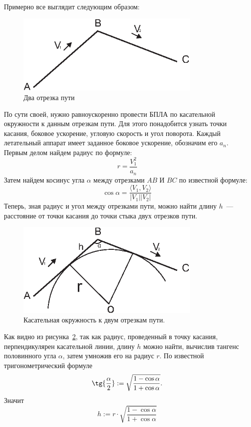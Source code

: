 \documentclass[a4paper,12pt]{article}
\begin{document}
Примерно все выглядит следующим образом:

\begin{figure}[ht!]
\centering
\includegraphics[width=90mm]{3point.eps}
\caption{Два отрезка пути}\label{two_lines}
\end{figure}

По сути своей, нужно равноускоренно провести БПЛА по касательной окружности к данным отрезкам пути. Для этого понадобится узнать точки касания, боковое ускорение, угловую скорость и угол поворота. Каждый летательный аппарат имеет заданное боковое ускорение, обозначим его $a_n$.
Первым делом найдем радиус  по формуле: 
$$r = \frac{V_1^2}{a_n}$$
Затем найдем косинус угла $\alpha$ между отрезками $AB$ И $BC$ по известной формуле:
$$\cos{\alpha} = \frac{\langle V_1,V_2 \rangle}{|V_1||V_2|}$$
Теперь, зная радиус и угол между отрезками пути, можно найти длину $h$~--- расстояние от точки касания до точки стыка двух отрезков пути.

\begin{figure}[ht!]
\centering
\includegraphics[width=90mm]{3pointCircle.eps}
\caption{Касательная окружность к двум отрезкам пути.}\label{two_lines_and_circle}
\end{figure}
Как видно из рисунка~\ref{two_lines_and_circle}, так как радиус, проведенный в точку касания, перпендикулярен касательной линии, длину $h$ можно найти, вычислив тангенс половинного угла $\alpha$, затем умножив его на радиус $r$. По известной тригонометрический формуле 
$$
  \tg{\frac{\alpha}{2}} := \sqrt{\frac{1-\cos{\alpha}}{1+\cos{\alpha}}}.
$$
Значит 
$$h := r \cdot \sqrt{\frac{1-\cos{\alpha}}{1+\cos{\alpha}}}$$
\end{document}
